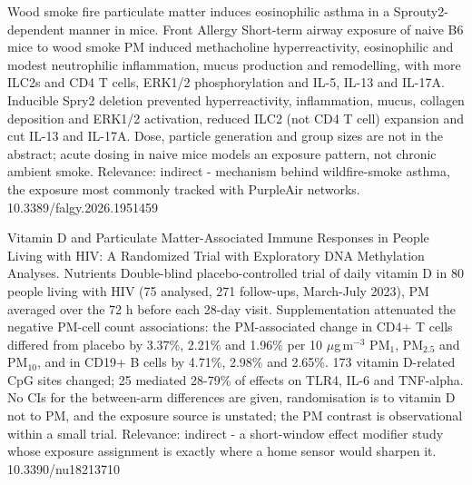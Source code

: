 \documentclass[10pt]{article}
\begin{document}
{Wood smoke fire particulate matter induces eosinophilic asthma in a Sprouty2-dependent manner in mice.}
{Front Allergy}
{Short-term airway exposure of naive B6 mice to wood smoke PM induced methacholine hyperreactivity, eosinophilic and modest neutrophilic inflammation, mucus production and remodelling, with more ILC2s and CD4 T cells, ERK1/2 phosphorylation and IL-5, IL-13 and IL-17A. Inducible Spry2 deletion prevented hyperreactivity, inflammation, mucus, collagen deposition and ERK1/2 activation, reduced ILC2 (not CD4 T cell) expansion and cut IL-13 and IL-17A. Dose, particle generation and group sizes are not in the abstract; acute dosing in naive mice models an exposure pattern, not chronic ambient smoke. Relevance: indirect - mechanism behind wildfire-smoke asthma, the exposure most commonly tracked with PurpleAir networks.}
{10.3389/falgy.2026.1951459}

\par{}\baselineskip{}\baselineskip
{}

{Vitamin D and Particulate Matter-Associated Immune Responses in People Living with HIV: A Randomized Trial with Exploratory DNA Methylation Analyses.}
{Nutrients}
{Double-blind placebo-controlled trial of daily vitamin D in 80 people living with HIV (75 analysed, 271 follow-ups, March-July 2023), PM averaged over the 72 h before each 28-day visit. Supplementation attenuated the negative PM-cell count associations: the PM-associated change in CD4+ T cells differed from placebo by 3.37\%, 2.21\% and 1.96\% per 10 $\mu$g\,m$^{-3}$ PM$_{1}$, PM$_{2.5}$ and PM$_{10}$, and in CD19+ B cells by 4.71\%, 2.98\% and 2.65\%. 173 vitamin D-related CpG sites changed; 25 mediated 28-79\% of effects on TLR4, IL-6 and TNF-alpha. No CIs for the between-arm differences are given, randomisation is to vitamin D not to PM, and the exposure source is unstated; the PM contrast is observational within a small trial. Relevance: indirect - a short-window effect modifier study whose exposure assignment is exactly where a home sensor would sharpen it.}
{10.3390/nu18213710}
\end{document}
